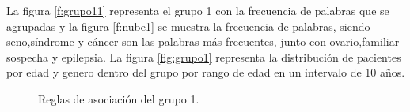 La figura \ref{f:grupo11} representa el grupo 1 con la frecuencia de palabras que se agrupadas y la figura \ref{f:nube1}  se muestra la frecuencia de palabras, siendo seno,síndrome y cáncer son las palabras más frecuentes, junto con ovario,familiar sospecha y epilepsia. La figura \ref{fig:grupo1} representa la distribución de pacientes por edad y genero dentro del grupo por rango de edad en un intervalo de 10 años.\\

\begin{figure}[H]
	\centering
	\caption{Reglas de asociación del grupo 1.}
	\label{fig:reglas1}
\end{figure}

